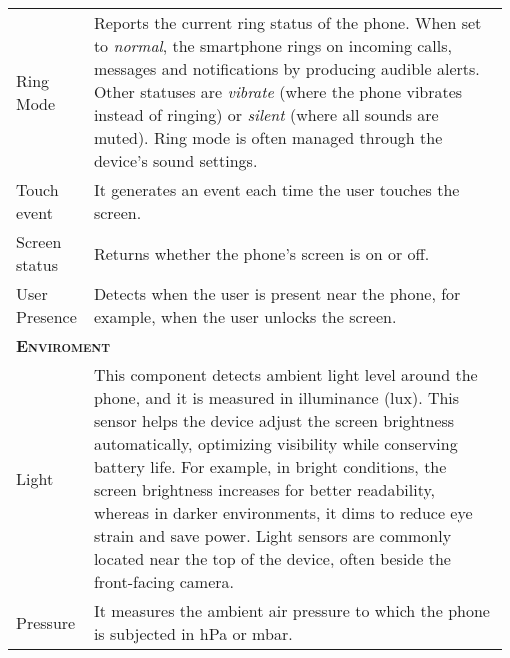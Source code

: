 \begin{center}
\begin{longtable}{p{0.15\linewidth}|p{0.83\linewidth}}
    Ring Mode & Reports the current ring status of the phone. When set to \textit{normal}, the smartphone rings on incoming calls, messages and notifications by producing audible alerts. Other statuses are \textit{vibrate} (where the phone vibrates instead of ringing) or \textit{silent} (where all sounds are muted). Ring mode is often managed through the device's sound settings. \\
    Touch event & It generates an event each time the user touches the screen. \\
    Screen status & Returns whether the phone’s screen is on or off.\\
    User Presence & Detects when the user is present near the phone, for example, when the user unlocks the screen. \\
    \multicolumn{2}{l}{\textbf{\textsc{Enviroment}}} \\
    Light &  This component detects ambient light level around the phone, and it is measured in illuminance (lux). 
    This sensor helps the device adjust the screen brightness automatically, optimizing visibility while conserving battery life. For example, in bright conditions, the screen brightness increases for better readability, whereas in darker environments, it dims to reduce eye strain and save power. Light sensors are commonly located near the top of the device, often beside the front-facing camera.
    \\
    Pressure & It measures the ambient air pressure to which the phone is subjected in hPa or mbar. \\
    \bottomrule
\end{longtable}
\end{center}